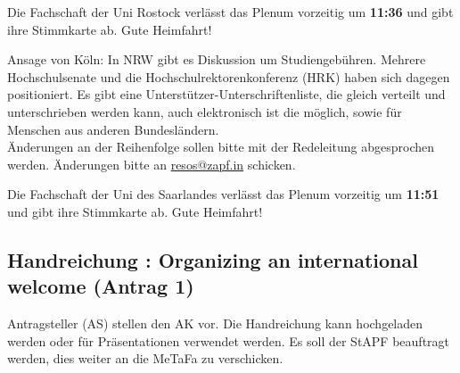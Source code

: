     \begin{info}{}
      Die Fachschaft der Uni Rostock verlässt das Plenum vorzeitig um \textbf{11:36} und gibt ihre Stimmkarte ab. Gute Heimfahrt!
    \end{info}

    Ansage von Köln: In NRW gibt es Diskussion um Studiengebühren. Mehrere Hochschulsenate und die Hochschulrektorenkonferenz (HRK) haben sich dagegen positioniert. Es gibt eine Unterstützer-Unterschriftenliste, die gleich verteilt und unterschrieben werden kann, auch elektronisch ist die möglich, sowie für Menschen aus anderen Bundesländern. \\

    Änderungen an der Reihenfolge sollen bitte mit der Redeleitung abgesprochen werden. Änderungen bitte an \url{resos@zapf.in} schicken.

    \begin{info}{}
      Die Fachschaft der Uni des Saarlandes verlässt das Plenum vorzeitig um \textbf{11:51} und gibt ihre Stimmkarte ab. Gute Heimfahrt!
    \end{info}

  \subsection{Handreichung : Organizing an international welcome (Antrag 1)}
    Antragsteller (AS) stellen den AK vor. Die Handreichung kann hochgeladen werden oder für Präsentationen verwendet werden. Es soll der StAPF beauftragt werden, dies weiter an die MeTaFa zu verschicken.

